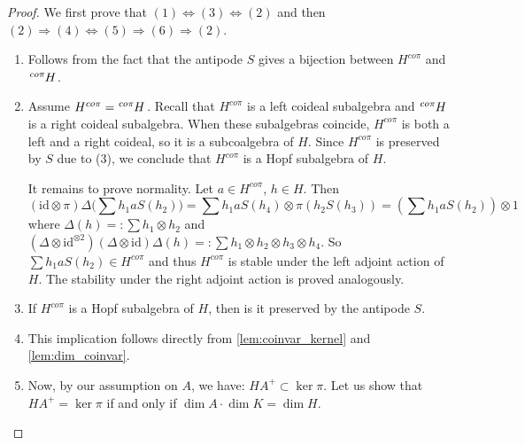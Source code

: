 \documentclass{amsart}
\theoremstyle{plain}%
\theoremstyle{remark}
\newcommand{\1}{\mathbbm{1}}
\newcommand{\id}{\mathrm{id}}
\newcommand{\prescr}[2]{\tensor*[^{#1}]{#2}{}}
\begin{document}
\begin{proof}
We first prove that $(1)\Leftrightarrow(3)\Leftrightarrow(2)$ and then $(2)\Rightarrow (4)\Leftrightarrow (5)\Rightarrow (6) \Rightarrow(2)$.

\begin{enumerate}

    \item[\textbf{[(1) $\Longleftrightarrow$ (3)]}] Follows from the fact that the antipode $S$ gives a bijection between $H^{co\pi}$ and $\prescr{co\pi}{H}$.
    
     \item[\textbf{[(1) $\Longrightarrow$ (2)]}] Assume $H^{co \pi} = \prescr{co\pi}{H}$.    
     Recall that $H^{co\pi}$ is a left coideal subalgebra and $\prescr{co\pi}{H}$ is a right coideal subalgebra. When these subalgebras coincide, $H^{co\pi}$ is both a left and a right coideal, so it is a subcoalgebra of $H$. Since $H^{co\pi}$ is preserved by $S$ due to (3), we conclude that $H^{co\pi}$ is a Hopf subalgebra of $H$.

     It remains to prove normality.
 Let $a\in H^{co \pi}$, $h\in H$. Then $$(\mathrm{id}\otimes\pi)\Delta\big(\sum h_1aS(h_2)\big)=\textstyle\sum h_1aS(h_4)\otimes\pi(h_2S(h_3))=(\sum h_1aS(h_2))\otimes1$$
 where $\Delta (h) =: \sum h_1\otimes h_2$ and $(\Delta\otimes \id^{\otimes 2})(\Delta\otimes \id)\Delta(h)=:\sum h_1\otimes h_2\otimes h_3 \otimes h_4$.
 So $\sum h_1aS(h_2)\in H^{co \pi}$ and thus $H^{co \pi}$ is stable under the left adjoint action of $H$. The stability under the right adjoint action is proved analogously.

     \item[\textbf{[(2) $\Longrightarrow$ (3)]}]
If $H^{co\pi}$ is a Hopf subalgebra of $H$, then is it preserved by the antipode $S$.

\item[\textbf{[(2) $\Longrightarrow$ (4)]}] This implication follows directly from \cref{lem:coinvar_kernel} and \cref{lem:dim_coinvar}.
     \item[\textbf{[(4) $\Longleftrightarrow$ (5)]}] 
      
Now, by our assumption on $A$, we have:  $HA^+\subset \ker\pi$.
Let us show that $ HA^+= \ker\pi$ if and only if $\dim A \cdot \dim K=\dim H$.


\end{enumerate}
\end{proof}
\end{document}
